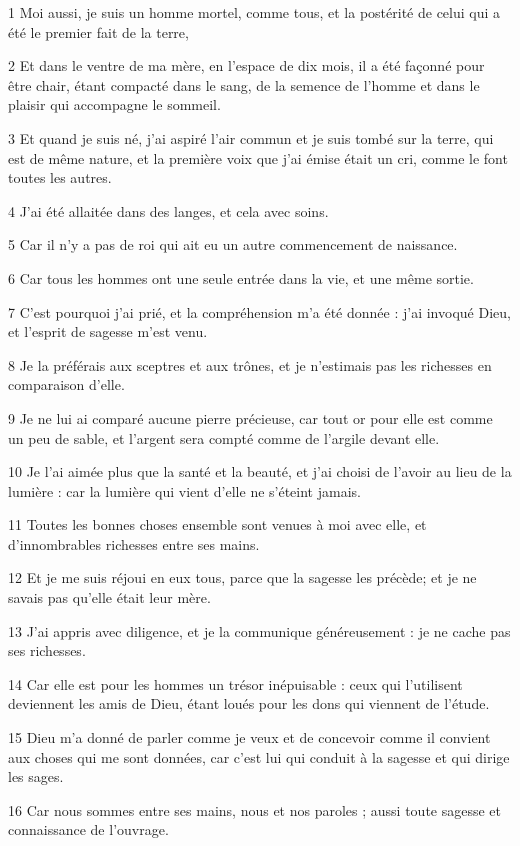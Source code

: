 \par 1 Moi aussi, je suis un homme mortel, comme tous, et la postérité de celui qui a été le premier fait de la terre,
\par 2 Et dans le ventre de ma mère, en l'espace de dix mois, il a été façonné pour être chair, étant compacté dans le sang, de la semence de l'homme et dans le plaisir qui accompagne le sommeil.
\par 3 Et quand je suis né, j'ai aspiré l'air commun et je suis tombé sur la terre, qui est de même nature, et la première voix que j'ai émise était un cri, comme le font toutes les autres.
\par 4 J'ai été allaitée dans des langes, et cela avec soins.
\par 5 Car il n'y a pas de roi qui ait eu un autre commencement de naissance.
\par 6 Car tous les hommes ont une seule entrée dans la vie, et une même sortie.
\par 7 C'est pourquoi j'ai prié, et la compréhension m'a été donnée : j'ai invoqué Dieu, et l'esprit de sagesse m'est venu.
\par 8 Je la préférais aux sceptres et aux trônes, et je n'estimais pas les richesses en comparaison d'elle.
\par 9 Je ne lui ai comparé aucune pierre précieuse, car tout or pour elle est comme un peu de sable, et l'argent sera compté comme de l'argile devant elle.
\par 10 Je l'ai aimée plus que la santé et la beauté, et j'ai choisi de l'avoir au lieu de la lumière : car la lumière qui vient d'elle ne s'éteint jamais.
\par 11 Toutes les bonnes choses ensemble sont venues à moi avec elle, et d'innombrables richesses entre ses mains.
\par 12 Et je me suis réjoui en eux tous, parce que la sagesse les précède; et je ne savais pas qu'elle était leur mère.
\par 13 J'ai appris avec diligence, et je la communique généreusement : je ne cache pas ses richesses.
\par 14 Car elle est pour les hommes un trésor inépuisable : ceux qui l'utilisent deviennent les amis de Dieu, étant loués pour les dons qui viennent de l'étude.
\par 15 Dieu m'a donné de parler comme je veux et de concevoir comme il convient aux choses qui me sont données, car c'est lui qui conduit à la sagesse et qui dirige les sages.
\par 16 Car nous sommes entre ses mains, nous et nos paroles ; aussi toute sagesse et connaissance de l'ouvrage.
